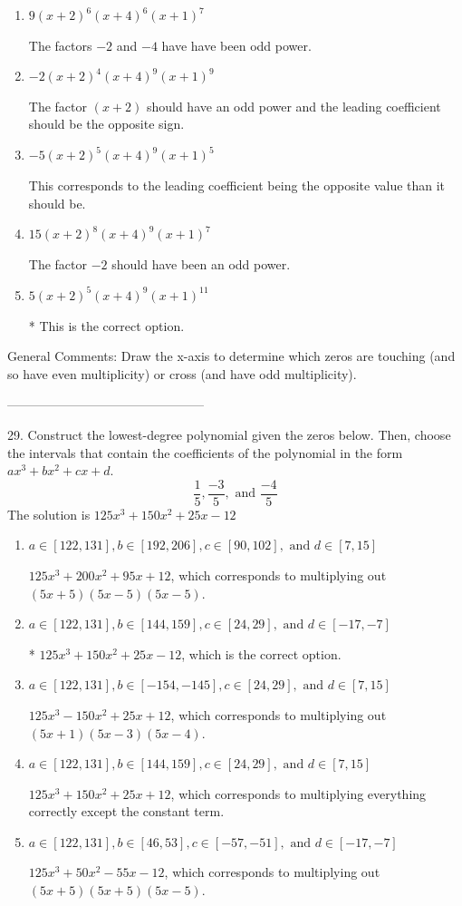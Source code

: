 \documentclass{extbook}[14pt]
\begin{document}
\begin{enumerate}[label=\Alph*.] 
\item $ 9(x + 2)^{6} (x + 4)^{6} (x + 1)^{7} $ 

 The factors $-2$ and $-4$ have have been odd power. 
\item $ -2(x + 2)^{4} (x + 4)^{9} (x + 1)^{9} $ 

 The factor $(x + 2)$ should have an odd power and the leading coefficient should be the opposite sign. 
\item $ -5(x + 2)^{5} (x + 4)^{9} (x + 1)^{5} $ 

 This corresponds to the leading coefficient being the opposite value than it should be. 
\item $ 15(x + 2)^{8} (x + 4)^{9} (x + 1)^{7} $ 

 The factor $-2$ should have been an odd power. 
\item $ 5(x + 2)^{5} (x + 4)^{9} (x + 1)^{11} $ 

 * This is the correct option. 
\end{enumerate} 
 
General Comments: Draw the x-axis to determine which zeros are touching (and so have even multiplicity) or cross (and have odd multiplicity).

-----------------------------------------------

29. Construct the lowest-degree polynomial given the zeros below. Then, choose the intervals that contain the coefficients of the polynomial in the form $ax^3+bx^2+cx+d$.
\[ \frac{1}{5}, \frac{-3}{5}, \text{ and } \frac{-4}{5} \] 
The solution is $ 125x^{3} +150 x^{2} +25 x -12 $ 

\begin{enumerate}[label=\Alph*.] 
\item $ a \in [122, 131], b \in [192, 206], c \in [90, 102], \text{ and } d \in [7, 15] $ 

 $125x^{3} +200 x^{2} +95 x + 12$, which corresponds to multiplying out $(5x + 5)(5x -5)(5x -5)$. 
\item $ a \in [122, 131], b \in [144, 159], c \in [24, 29], \text{ and } d \in [-17, -7] $ 

 * $125x^{3} +150 x^{2} +25 x -12$, which is the correct option. 
\item $ a \in [122, 131], b \in [-154, -145], c \in [24, 29], \text{ and } d \in [7, 15] $ 

 $125x^{3} -150 x^{2} +25 x + 12$, which corresponds to multiplying out $(5x + 1)(5x -3)(5x -4)$. 
\item $ a \in [122, 131], b \in [144, 159], c \in [24, 29], \text{ and } d \in [7, 15] $ 

 $125x^{3} +150 x^{2} +25 x + 12$, which corresponds to multiplying everything correctly except the constant term. 
\item $ a \in [122, 131], b \in [46, 53], c \in [-57, -51], \text{ and } d \in [-17, -7] $ 

 $125x^{3} +50 x^{2} -55 x -12$, which corresponds to multiplying out $(5x + 5)(5x + 5)(5x -5)$. 
\end{enumerate} 
 
\end{document}
